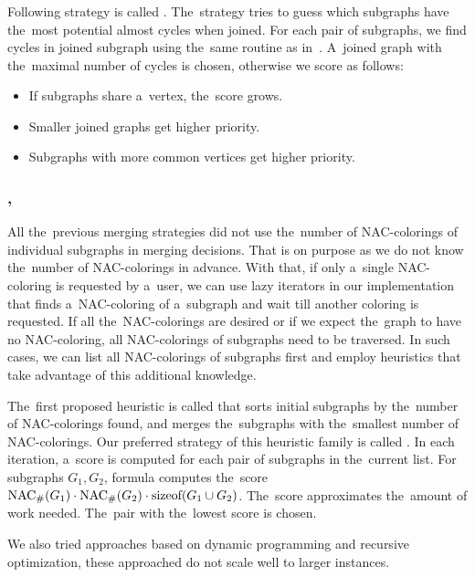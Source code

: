 \subsubsection*{\PromisingCycles{}}

Following strategy is called \PromisingCycles{}.
The~strategy tries to guess which subgraphs
have the~most potential almost cycles when joined.
For each pair of subgraphs, we find cycles in joined subgraph using
the~same routine as in~.
A~joined graph with the~maximal number of cycles is chosen,
otherwise we score as follows:
%
\begin{itemize}
	\item If subgraphs share a~vertex, the~score grows.
	\item Smaller joined graphs get higher priority.
	\item Subgraphs with more common vertices get higher priority.
\end{itemize}
%

\subsubsection*{\SortedSize{}, \Score{}}

All the~previous merging strategies did not use the~number of NAC-colorings
of individual subgraphs in merging decisions.
That is on purpose as we do not know the~number of NAC-colorings in advance.
With that, if only a~single NAC-coloring is requested by a~user,
we can use lazy iterators in our implementation that
finds a~NAC-coloring of a~subgraph and wait till another coloring is requested.
If all the~NAC-colorings are desired or if we expect the~graph to have no NAC-coloring,
all NAC-colorings of subgraphs need to be traversed.
In such cases, we can list all NAC-colorings of subgraphs first
and employ heuristics that take advantage of this additional knowledge.

The~first proposed heuristic is called \SortedSize{}
that sorts initial subgraphs by the~number of NAC-colorings found,
and merges the~subgraphs with the~smallest number of NAC-colorings.
%
Our preferred strategy of this heuristic family is called \Score{}.
In each iteration, a~score is computed for each pair of subgraphs in the~current list.
For subgraphs \( G_1, G_2 \), formula computes the~score
\( \operatorname{NAC}_{\#} (G_1) \cdot \operatorname{NAC}_{\#} (G_2) \cdot \text{sizeof}(G_1 \cup G_2) \).
The~score approximates the~amount of work needed.
The~pair with the~lowest score is chosen.

We also tried approaches based on dynamic programming and recursive optimization,
these approached do not scale well to larger instances.


